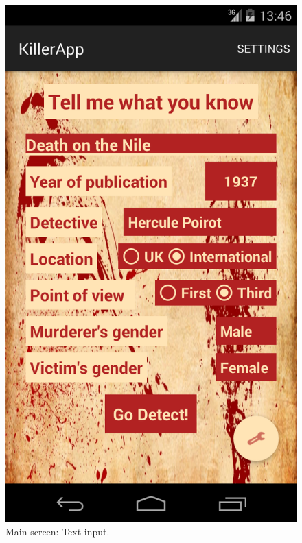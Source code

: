 \documentclass{mproj}
\begin{document}
\begin{figure}[h]
		\includegraphics[width=\linewidth]{images/text_input}	
		\caption{Main screen: Text input.}	
		\label{fig:text_input}
	\endminipage\hfill

\end{figure}
\end{document}

